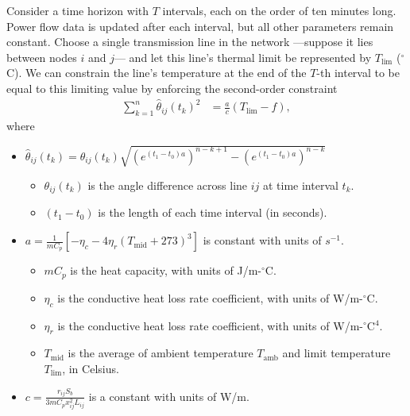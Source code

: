 \documentclass[journal,twoside]{IEEEtran}
\begin{document}
Consider a time horizon with $T$ intervals, each on the order of ten minutes long. Power flow data is updated after each interval, but all other parameters remain constant. Choose a single transmission line in the network ---suppose it lies between nodes $i$ and $j$--- and let this line's thermal limit be represented by $T_\text{lim}$ ($^\circ$C). We can constrain the line's temperature at the end of the $T$-th interval to be equal to this limiting value by enforcing the second-order constraint
\begin{align}\label{eq:tempconstraint}
\sum_{k=1}^n \hat{\theta}_{ij}(t_k)^2 &= \frac{a}{c}\left(T_\text{lim} - f\right),
\end{align}
where
\begin{itemize}
\itemsep1pt\parskip0pt
\item
  $\hat{\theta}_{ij}(t_{k})=  \theta_{ij}(t_k)\sqrt{ (e^{(t_1-t_0)a})^{n-k+1} - (e^{(t_1-t_0)a})^{n-k} } $

  \begin{itemize}
  \itemsep1pt\parskip0pt
  \item
    $\theta_{ij}(t_k)$ is the angle difference across line $ij$ at time
    interval $t_k$.
  \item
    $(t_1-t_0)$ is the length of each time interval (in seconds).
  \end{itemize}
\item
  $ a =
  \frac{1}{mC_p}\left[ -\eta_c - 4\eta_r(T_\text{mid} + 273)^3 \right]$
  is constant with units of $s^{-1}$.

  \begin{itemize}
  \itemsep1pt\parskip0pt
  \item
    $mC_p$ is the heat capacity, with units of J/m-$^\circ$C.
  \item
    $\eta_c$ is the conductive heat loss rate coefficient, with units of
    W/m-$^\circ$C.
  \item
    $\eta_r$ is the conductive heat loss rate coefficient, with units of
    W/m-$^\circ$C$^4$.
  \item
    $T_\text{mid}$ is the average of ambient temperature $T_\text{amb}$
    and limit temperature $T_\text{lim}$, in Celsius.
  \end{itemize}
\item
  $c = \frac{r_{ij}S_b}{3 mC_p x_{ij}^2L_{ij}}$ is a constant with units
  of W/m.


\end{itemize}
\end{document}
